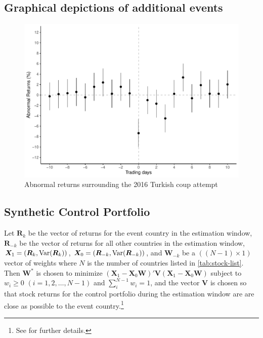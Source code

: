\documentclass[12pt,final,fleqn]{article}
\theoremstyle{plain}
\newcommand\var{{\rm Var}}
\begin{document}
\clearpage
\pagebreak

\subsection{Graphical depictions of additional events}



\begin{figure}[!htb]
\centering
\includegraphics[scale=0.75]{../figs/turkey_coup_attempt_2016.pdf}
\caption{Abnormal returns surrounding the 2016 Turkish coup attempt}
\label{fig:AR-Turkey-2016}
\end{figure}


\pagebreak

\subsection{Synthetic Control Portfolio}
Let $\boldsymbol{R}_{k}$ be the vector of returns for the event country in the estimation window, $\boldsymbol{R}_{-k}$ be the vector of returns for all other countries in the estimation window, $\boldsymbol{X}_1=(\boldsymbol{R}_{k},\var(\boldsymbol{R}_{k}))$, $\boldsymbol{X}_0=(\boldsymbol{R}_{-k},\var(\boldsymbol{R}_{-k}))$, and $\boldsymbol{W}_{-k}$ be a $((N-1) \times 1)$ vector of weights where $N$ is the number of countries listed in \autoref{tab:stock-list}. Then $\boldsymbol{W}^*$ is chosen to minimize $(\boldsymbol{X}_1-\boldsymbol{X}_0\boldsymbol{W})'\boldsymbol{V}(\boldsymbol{X}_1-\boldsymbol{X}_0\boldsymbol{W})$ subject to $w_i\geq0$ $(i = 1,2,\ldots,N-1)$ and $\sum_i^{N-1} w_i = 1$, and the vector $\boldsymbol{V}$ is chosen so that stock returns for the control portfolio during the estimation window are are close as possible to the event country.\footnote{See \citet{abadie2003economic} for further details.}
\end{document}
